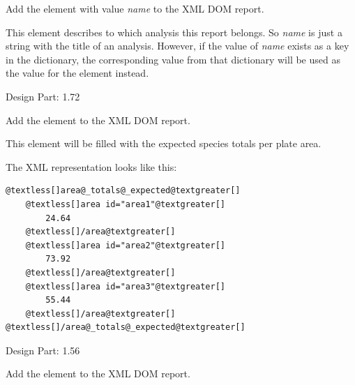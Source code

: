 \documentclass[letterpaper,10pt,english]{sphinxmanual}
\begin{document}
\begin{fulllineitems}
\begin{fulllineitems}
\end{fulllineitems}


\begin{fulllineitems}
\label{setlyze/std:setlyze.std.ReportGenerator.set_analysis}
Add the element  with value \emph{name} to the XML DOM
report.

This element describes to which analysis this report belongs. So
\emph{name} is just a string with the title of an analysis. However,
if the value of \emph{name} exists as a key in the 
dictionary, the corresponding value from that dictionary will
be used as the value for the element instead.

Design Part: 1.72

\end{fulllineitems}


\begin{fulllineitems}
\label{setlyze/std:setlyze.std.ReportGenerator.set_area_totals_expected}
Add the element  to the XML DOM
report.

This element will be filled with the expected species totals per
plate area.

The XML representation looks like this:

\begin{Verbatim}[commandchars=@\[\]]
@textless[]area@_totals@_expected@textgreater[]
    @textless[]area id="area1"@textgreater[]
        24.64
    @textless[]/area@textgreater[]
    @textless[]area id="area2"@textgreater[]
        73.92
    @textless[]/area@textgreater[]
    @textless[]area id="area3"@textgreater[]
        55.44
    @textless[]/area@textgreater[]
@textless[]/area@_totals@_expected@textgreater[]
\end{Verbatim}

Design Part: 1.56

\end{fulllineitems}


\begin{fulllineitems}
\label{setlyze/std:setlyze.std.ReportGenerator.set_area_totals_observed}
Add the element  to the XML DOM
report.


\end{fulllineitems}
\end{fulllineitems}
\end{document}
